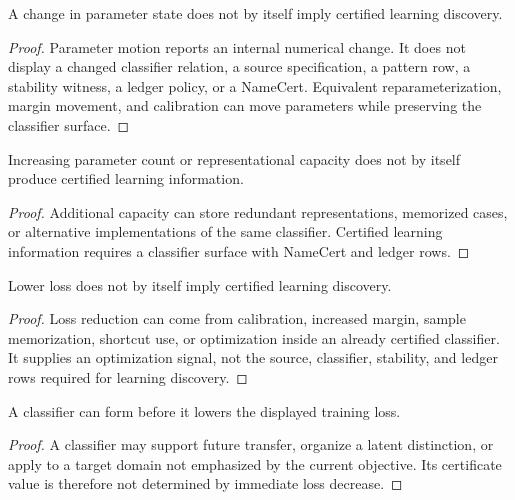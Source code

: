 \begin{theorem}
\label{thm:philosophy-parameter-motion-not-learning-discovery}
A change in parameter state does not by itself imply certified learning
discovery.
\end{theorem}
\begin{proof}
Parameter motion reports an internal numerical change. It does not
display a changed classifier relation, a source specification, a pattern
row, a stability witness, a ledger policy, or a NameCert. Equivalent
reparameterization, margin movement, and calibration can move parameters
while preserving the classifier surface.
\end{proof}

\begin{theorem}
\label{thm:philosophy-model-size-not-certified-information}
Increasing parameter count or representational capacity does not by
itself produce certified learning information.
\end{theorem}
\begin{proof}
Additional capacity can store redundant representations, memorized
cases, or alternative implementations of the same classifier. Certified
learning information requires a classifier surface with NameCert and
ledger rows.
\end{proof}

\begin{theorem}
\label{thm:philosophy-loss-reduction-not-learning-discovery}
Lower loss does not by itself imply certified learning discovery.
\end{theorem}
\begin{proof}
Loss reduction can come from calibration, increased margin, sample
memorization, shortcut use, or optimization inside an already certified
classifier. It supplies an optimization signal, not the source,
classifier, stability, and ledger rows required for learning discovery.
\end{proof}

\begin{theorem}
\label{thm:philosophy-learning-discovery-can-precede-loss-reduction}
A classifier can form before it lowers the displayed training loss.
\end{theorem}
\begin{proof}
A classifier may support future transfer, organize a latent distinction,
or apply to a target domain not emphasized by the current objective. Its
certificate value is therefore not determined by immediate loss
decrease.
\end{proof}

